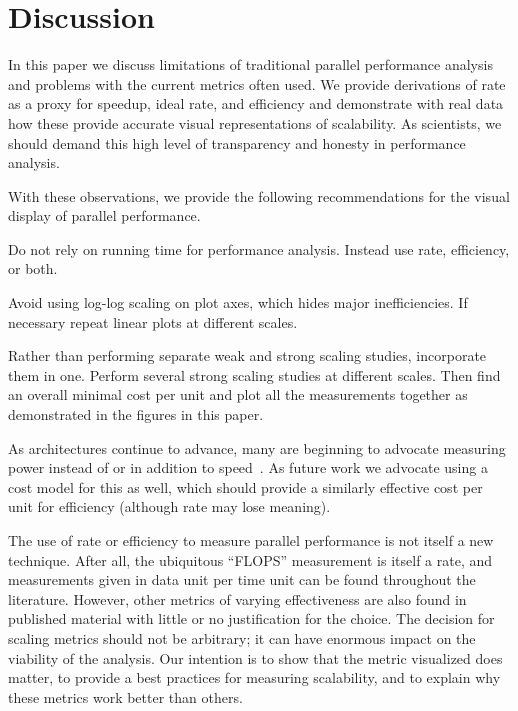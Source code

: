 \documentclass{llncs}
\newcommand*{\lcite}[1]{~\cite{#1}}
\newenvironment{packed_itemize}{
  \begin{itemize}[noitemsep]
}{
  \end{itemize}
}
\begin{document}
\section{Discussion}

\noindent
In this paper we discuss limitations of traditional parallel performance
analysis and problems with the current metrics often used. We provide
derivations of rate as a proxy for speedup, ideal rate, and efficiency and
demonstrate with real data how these provide accurate visual
representations of scalability. As scientists, we should demand this high
level of transparency and honesty in performance analysis.

With these observations, we provide the following recommendations for the
visual display of parallel performance.
\begin{packed_itemize}
\item Do not rely on running time for performance analysis. Instead use
  rate, efficiency, or both.
\item Avoid using log-log scaling on plot axes, which hides major
  inefficiencies. If necessary repeat linear plots at different scales.
\item Rather than performing separate weak and strong scaling studies,
  incorporate them in one. Perform several strong scaling studies at
  different scales. Then find an overall minimal cost per unit and plot all
  the measurements together as demonstrated in the figures in this paper.
\end{packed_itemize}

As architectures continue to advance, many are beginning to advocate
measuring power instead of or in addition to speed\lcite{Cameron2012}. As
future work we advocate using a cost model for this as well, which should
provide a similarly effective cost per unit for efficiency (although rate
may lose meaning).

The use of rate or efficiency to measure parallel performance is not itself
a new technique. After all, the ubiquitous ``FLOPS'' measurement is itself
a rate, and measurements given in data unit per time unit can be found
throughout the literature. However, other metrics of varying effectiveness
are also found in published material with little or no justification for
the choice. The decision for scaling metrics should not be arbitrary; it
can have enormous impact on the viability of the analysis. Our intention is
to show that the metric visualized does matter, to provide a best practices
for measuring scalability, and to explain why these metrics work better
than others.
\end{document}
